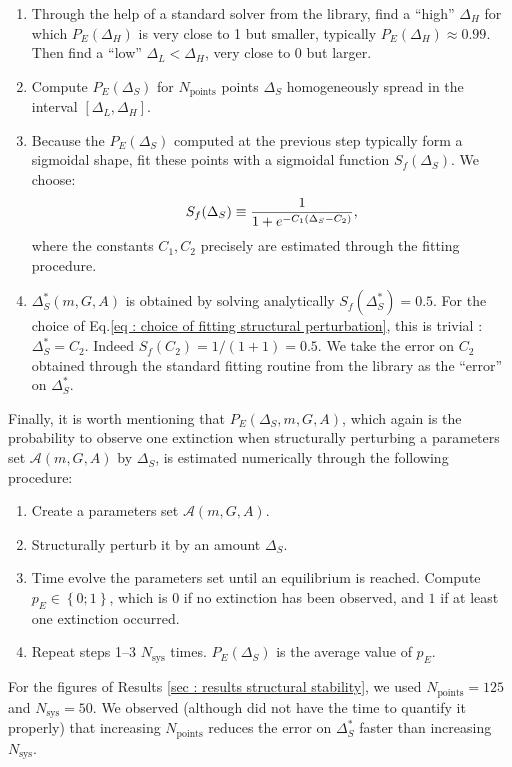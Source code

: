 \documentclass[12pt, titlepage]{report}
\begin{document}
\begin{enumerate}
\item Through the help of a standard solver from the  library, find a ``high'' $\Delta_H$ for which $P_E(\Delta_H)$ is very close to 1 but smaller, typically $P_E(\Delta_H) \approx 0.99$. Then find a ``low'' $\Delta_L < \Delta_H$, very close to $0$ but larger.
\item Compute $P_E(\Delta_S)$ for $N_{\text{points}}$ points $\Delta_S$ homogeneously spread in the interval $[\Delta_L, \Delta_H]$.
\item Because the $P_E(\Delta_S)$ computed at the previous step typically form a sigmoidal shape, fit these points with a sigmoidal function $S_f(\Delta_S)$. We choose:
\begin{equation}
S_f(\Delta_S) \equiv \frac{1}{1+e^{-C_1(\Delta_S-C_2)}}, \label{eq : choice of fitting structural perturbation}
\end{equation}
where the constants $C_1, C_2$ precisely are estimated through the fitting procedure.
\item $\Delta_S^*(m, G, A)$ is obtained by solving analytically $S_f(\Delta_S^*)=0.5$. For the choice of Eq.\eqref{eq : choice of fitting structural perturbation}, this is trivial : $\Delta_S^* = C_2$. Indeed $S_f(C_2)=1/(1+1)=0.5$. We take the error on $C_2$ obtained through the standard fitting routine from the  library as the ``error'' on $\Delta_S^*$.
\end{enumerate}
Finally, it is worth mentioning that $P_E(\Delta_S, m, G, A)$, which again is the probability to observe  one extinction when structurally perturbing a parameters set $\mathcal{A}(m,G,A)$ by $\Delta_S$, is estimated numerically through the following procedure:
\begin{enumerate}
\item Create a parameters set $\mathcal{A}(m, G, A)$.
\item Structurally perturb it by an amount $\Delta_S$.
\item Time evolve the parameters set until an equilibrium is reached. Compute $p_E \in \left\{0;1\right\}$, which is $0$ if no extinction has been observed, and $1$ if at least one extinction occurred.
\item Repeat steps 1--3 $N_{\text{sys}}$ times. $P_E(\Delta_S)$ is the average value of $p_E$.
\end{enumerate}
For the figures of Results \ref{sec : results structural stability}, we used $N_\text{points}=125$ and $N_\text{sys}=50$. We observed (although did not have the time to quantify it properly) that increasing $N_\text{points}$ reduces the error on $\Delta_S^*$ faster than increasing $N_\text{sys}$.
\end{document}
